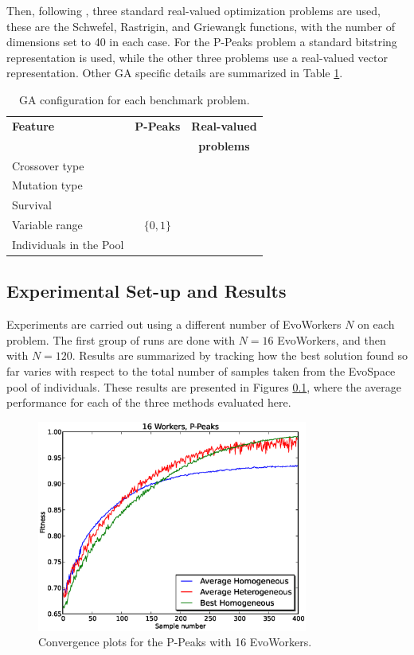 \documentclass{sig-alternate}
\begin{document}
Then, following \cite{fuku1}, three standard real-valued optimization problems are used,
these are the Schwefel, Rastrigin, and Griewangk functions, with the number of dimensions set to
40 in each case. 
For the P-Peaks problem a standard bitstring representation is used, while the other three problems use a real-valued
vector representation.
Other GA specific details are summarized in Table \ref{tab:ga}.

\begin{table}[!t]
\caption{GA configuration for each benchmark problem.}
\label{tab:ga}
\centering
\begin{tabular}{|l|c|c|}
\hline
\textbf{Feature} & \textbf{P-Peaks} & \textbf{Real-valued} \\
& & \textbf{problems} \\
\hline
\hline
Crossover type & & \\
Mutation type & & \\
Survival & & \\
Variable range & $\{0,1\}$ & \\
Individuals in the Pool &  & \\
\hline
\end{tabular}
\end{table}

\subsection{Experimental Set-up and Results}
Experiments are carried out using a different number of EvoWorkers $N$ on each problem.
The first group of runs are done with $N=16$ EvoWorkers, and then with $N=120$.
Results are summarized by tracking how the best solution found so far varies with respect to the total
number of samples taken from the EvoSpace pool of individuals.
These results are presented in Figures \ref{}, where the average performance for
each of the three methods evaluated here.

\begin{figure}[t]
\centering
\includegraphics[width=3.5in]{eps/PPeaks-w16.eps}
\caption{Convergence plots for the P-Peaks with 16 EvoWorkers.}
\label{fig:PPeaks-w16}
\end{figure}
\end{document}
